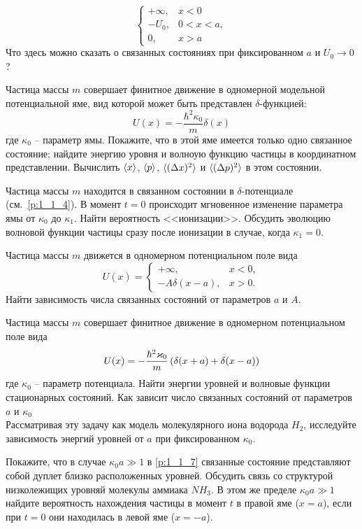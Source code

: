 \begin{problem}
$$\begin{cases}
+\infty, & x < 0\\
-U_0, & 0 < x < a,\\
0, & x > a
\end{cases}
$$%
%
Что здесь можно сказать о связанных состояниях при фиксированном $a$ и $U_0 \to 0$?
%
\item\label{p:1_1_4}%
Частица массы $m$ совершает финитное движение в одномерной модельной потенциальной яме, вид которой может быть представлен $\delta$-функцией:
$$
U(x) = -\frac{\hbar^2 \kappa_0}{m} \delta(x)
$$%
%
где $\kappa_0$ -- параметр ямы. Покажите, что в этой яме имеется только одно связанное состояние; найдите энергию уровня и волноую функцию частицы в координатном представлении. Вычислить $\langle{x}\rangle$, $\langle{p}\rangle$, $\langle{(\Delta x)^2}\rangle$ и $\langle{(\Delta p)^2}\rangle$ в этом состоянии.
%
\item\label{p:1_1_5}%
Частица массы $m$ находится в связанном состоянии в $\delta$-потенциале (см.~\cref{p:1_1_4}). В момент $t=0$ происходит мгновенное изменение параметра ямы от $\kappa_0$ до $\kappa_1$. Найти вероятность <<ионизации>>. Обсудить эволюцию волновой функции частицы сразу после ионизации в случае, когда $\kappa_1 = 0$.
%
\item\label{p:1_1_6}%
Частица массы $m$ движется в одномерном потенциальном поле вида
$$
U(x) =
\begin{cases}
+\infty, & x < 0,\\
-A\delta(x-a), & x > 0.
\end{cases}
$$%
%
Найти зависимость числа связанных состояний от параметров $a$ и $A$.
%
\item\label{p:1_1_7}%
Частица массы $m$ совершает финитное движение в одномерном потенциальном поле вида
$$
U(x) = -\frac{\hbar^2 \varkappa_0}{m} \left ( {\delta(x+a) + \delta(x-a)} \right )
$$%
%
где $\kappa_0$ -- параметр потенциала. Найти энергии уровней и волновые функции стационарных состояний. Как зависит число связанных состояний от параметров $a$ и $\kappa_0$\\
Рассматривая эту задачу как модель молекулярного иона водорода $H_2$, исследуйте зависимость энергий уровней от $a$ при фиксированном $\kappa_0$.
%
\item\label{p:1_1_8}%
Покажите, что в случае $\kappa_0 a \gg 1$ в \cref{p:1_1_7} связанные состояние представляют собой дуплет близко расположенных уровней. Обсудить связь со структурой низколежищих уровняй молекулы аммиака $NH_3$. В этом же пределе $\kappa_0 a \gg 1$ найдите вероятность нахождения частицы в момент $t$ в правой яме ($x = a$), если при $t=0$ они находилась в левой яме ($x = -a$).

\end{problem}
